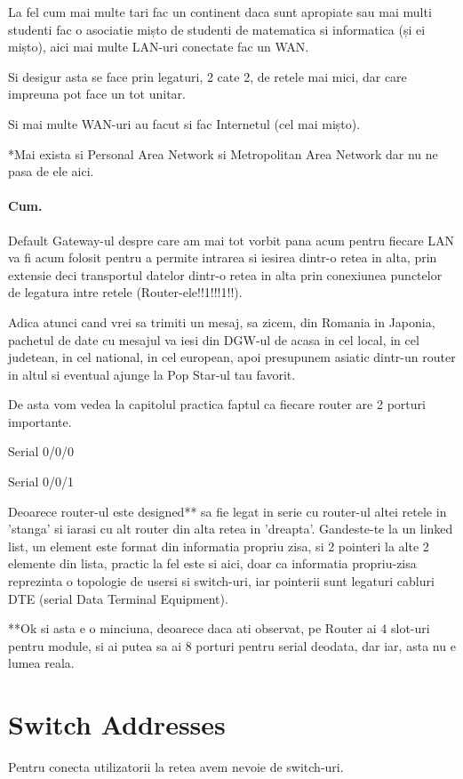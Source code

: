 \documentclass{article}
\begin{document}
La fel cum mai multe tari fac un continent daca sunt apropiate sau mai multi studenti fac o asociatie mișto de studenti de matematica si informatica (și ei mișto), aici mai multe LAN-uri conectate fac un WAN.

Si desigur asta se face prin legaturi, 2 cate 2, de retele mai mici, dar care impreuna pot face un tot unitar.

Si mai multe WAN-uri au facut si fac Internetul (cel mai mișto).


*Mai exista si Personal Area Network si Metropolitan Area Network dar nu ne pasa de ele aici.

\paragraph{Cum.}

Default Gateway-ul despre care am mai tot vorbit pana acum pentru fiecare LAN va fi acum folosit pentru a permite intrarea si iesirea dintr-o retea in alta, prin extensie deci transportul datelor dintr-o retea in alta prin conexiunea punctelor de legatura intre retele (Router-ele!!1!!!1!!).

Adica atunci cand vrei sa trimiti un mesaj, sa zicem, din Romania in Japonia, pachetul de date cu mesajul va iesi din DGW-ul de acasa in cel local, in cel judetean, in cel national, in cel european, apoi presupunem asiatic dintr-un router in altul si eventual ajunge la Pop Star-ul tau favorit.

De asta vom vedea la capitolul practica faptul ca fiecare router are 2 porturi importante.

Serial 0/0/0

Serial 0/0/1

Deoarece router-ul este designed** sa fie legat in serie cu router-ul altei retele in 'stanga' si iarasi cu alt router din alta retea in 'dreapta'. Gandeste-te la un linked list, un element este format din informatia propriu zisa, si 2 pointeri la alte 2 elemente din lista, practic la fel este si aici, doar ca informatia propriu-zisa reprezinta o topologie de usersi si switch-uri, iar pointerii sunt legaturi cabluri DTE (serial Data Terminal Equipment).


**Ok si asta e o minciuna, deoarece daca ati observat, pe Router ai 4 slot-uri pentru module, si ai putea sa ai 8 porturi pentru serial deodata, dar iar, asta nu e lumea reala.




\section{Switch Addresses}
 Pentru conecta utilizatorii la retea avem nevoie de switch-uri.
\end{document}
